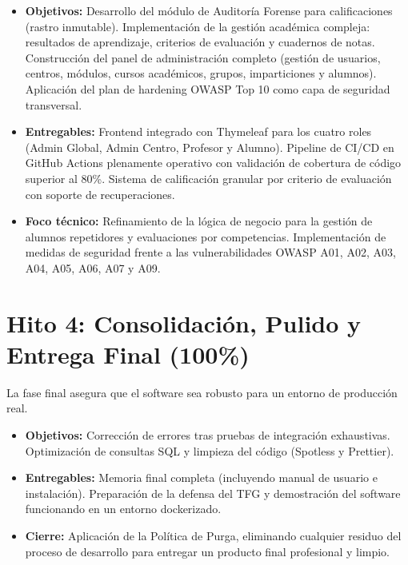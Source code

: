 \documentclass[12pt, a4paper]{report}
\begin{document}
\begin{itemize}
  \item \textbf{Objetivos:} Desarrollo del módulo de Auditoría Forense para calificaciones (rastro inmutable). Implementación de la gestión académica compleja: resultados de aprendizaje, criterios de evaluación y cuadernos de notas. Construcción del panel de administración completo (gestión de usuarios, centros, módulos, cursos académicos, grupos, imparticiones y alumnos). Aplicación del plan de hardening OWASP Top 10 como capa de seguridad transversal.
  \item \textbf{Entregables:} Frontend integrado con Thymeleaf para los cuatro roles (Admin Global, Admin Centro, Profesor y Alumno). Pipeline de CI/CD en GitHub Actions plenamente operativo con validación de cobertura de código superior al 80\%. Sistema de calificación granular por criterio de evaluación con soporte de recuperaciones.
  \item \textbf{Foco técnico:} Refinamiento de la lógica de negocio para la gestión de alumnos repetidores y evaluaciones por competencias. Implementación de medidas de seguridad frente a las vulnerabilidades OWASP A01, A02, A03, A04, A05, A06, A07 y A09.
\end{itemize}

\section{Hito 4: Consolidación, Pulido y Entrega Final (100\%)}

La fase final asegura que el software sea robusto para un entorno de producción real.

\begin{itemize}
  \item \textbf{Objetivos:} Corrección de errores tras pruebas de integración exhaustivas. Optimización de consultas SQL y limpieza del código (Spotless y Prettier).
  \item \textbf{Entregables:} Memoria final completa (incluyendo manual de usuario e instalación). Preparación de la defensa del TFG y demostración del software funcionando en un entorno dockerizado.
  \item \textbf{Cierre:} Aplicación de la Política de Purga, eliminando cualquier residuo del proceso de desarrollo para entregar un producto final profesional y limpio.
\end{itemize}

\end{document}

